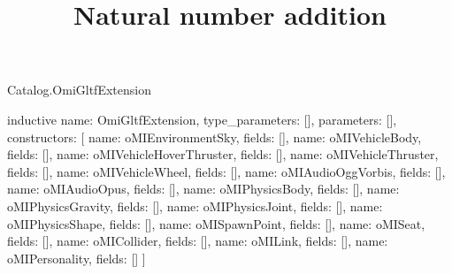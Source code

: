 \begin{lexlean}{Catalog.OmiGltfExtension}
\title{Natural number addition}
\begin{semanticmodule}
inductive{
  name: OmiGltfExtension,
  type_parameters: [],
  parameters: [],
  constructors: [
    {name: oMIEnvironmentSky, fields: []},
    {name: oMIVehicleBody, fields: []},
    {name: oMIVehicleHoverThruster, fields: []},
    {name: oMIVehicleThruster, fields: []},
    {name: oMIVehicleWheel, fields: []},
    {name: oMIAudioOggVorbis, fields: []},
    {name: oMIAudioOpus, fields: []},
    {name: oMIPhysicsBody, fields: []},
    {name: oMIPhysicsGravity, fields: []},
    {name: oMIPhysicsJoint, fields: []},
    {name: oMIPhysicsShape, fields: []},
    {name: oMISpawnPoint, fields: []},
    {name: oMISeat, fields: []},
    {name: oMICollider, fields: []},
    {name: oMILink, fields: []},
    {name: oMIPersonality, fields: []}
  ]
}
\end{semanticmodule}
\end{lexlean}
